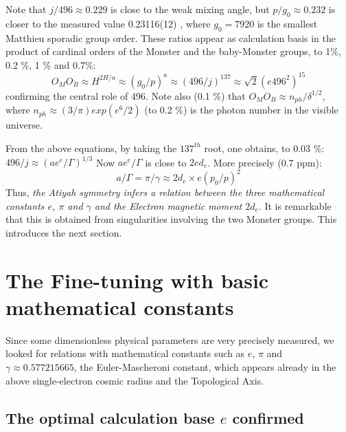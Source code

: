\documentclass[twoside,draft]{article}
\begin{document}
\begin{sloppypar}
Note that $j/496 \approx 0.229$ is close to the weak mixing angle, but $p/g_0 \approx 0.232$ is closer to the measured value 0.23116(12) \cite{Tanabashi}, where $g_0 = 7920 $ is the smallest Matthieu sporadic group order. These ratios appear as calculation basis in the product of cardinal orders of the Monster and the baby-Monster groups, to 1\%, 0.2 \%, 1 \% and 0.7\%:
\begin{equation}
O_MO_B\approx H^{2H/a} \approx (g_0/p)^a \approx (496/j)^{137} \approx \sqrt{2}(e496^2)^{15}
\end{equation}
confirming the central role of 496. Note also (0.1 \%) that $O_MO_B \approx  n_{ph}/\delta^{1/2}$, where $n_{ph}\approx (3/\pi) exp(e^6/2)$ (to 0.2 \%) is the photon number in the visible universe. 

From the above equations, by taking the $137^{th}$ root, one obtains, to 0.03 \%: $496/j \approx (ae^e/\Gamma)^{1/3}$
Now $ae^e/\Gamma$ is close to $2ed_e$. More precisely (0.7 ppm):
\begin{equation}
a/\Gamma = \pi/\gamma \approx 2d_e \times e (p_0/p)^2 
\end{equation}
Thus, \textit{the Atiyah symmetry infers a relation between the three mathematical constants $e$, $\pi$ and $\gamma$ and the Electron magnetic moment $2d_e$}. It is remarkable that this is obtained from singularities involving the two Monster groups. This introduces the next section.

\section{The Fine-tuning with basic mathematical constants}

Since some dimensionless physical parameters are very precisely measured, we looked for
relations with mathematical constants such as $e$, $\pi$ and $\gamma \approx
0.577215665$, the Euler-Mascheroni constant, which appears already in the above single-electron
cosmic radius and the Topological Axis.

\subsection {The optimal calculation base $e$ confirmed}


\end{sloppypar}
\end{document}
